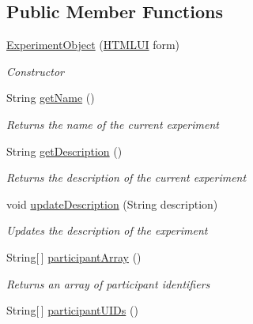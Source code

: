 \subsection*{Public Member Functions}
\begin{DoxyCompactItemize}
\item 
\hyperlink{class_web_analyzer_1_1_u_i_1_1_interaction_objects_1_1_experiment_object_aa99f1fedb72d6876d8d4020e89ca4315}{Experiment\+Object} (\hyperlink{class_web_analyzer_1_1_u_i_1_1_h_t_m_l_u_i}{H\+T\+M\+L\+U\+I} form)
\begin{DoxyCompactList}\small\item\em Constructor \end{DoxyCompactList}\item 
String \hyperlink{class_web_analyzer_1_1_u_i_1_1_interaction_objects_1_1_experiment_object_a5e02c96733933f6e14d50f48fcaf4edc}{get\+Name} ()
\begin{DoxyCompactList}\small\item\em Returns the name of the current experiment \end{DoxyCompactList}\item 
String \hyperlink{class_web_analyzer_1_1_u_i_1_1_interaction_objects_1_1_experiment_object_af25a51caebf59867b0eeeb2680dfd1fd}{get\+Description} ()
\begin{DoxyCompactList}\small\item\em Returns the description of the current experiment \end{DoxyCompactList}\item 
void \hyperlink{class_web_analyzer_1_1_u_i_1_1_interaction_objects_1_1_experiment_object_ac8daa908afe1e91d835d6df6c4d53caa}{update\+Description} (String description)
\begin{DoxyCompactList}\small\item\em Updates the description of the experiment \end{DoxyCompactList}\item 
String\mbox{[}$\,$\mbox{]} \hyperlink{class_web_analyzer_1_1_u_i_1_1_interaction_objects_1_1_experiment_object_a1a43f8d6cc9b6b773681f766d8273023}{participant\+Array} ()
\begin{DoxyCompactList}\small\item\em Returns an array of participant identifiers \end{DoxyCompactList}\item 
String\mbox{[}$\,$\mbox{]} \hyperlink{class_web_analyzer_1_1_u_i_1_1_interaction_objects_1_1_experiment_object_a5f4674c9f3a4ef9214bd6722f356ff14}{participant\+U\+I\+Ds} ()

\end{DoxyCompactItemize}
